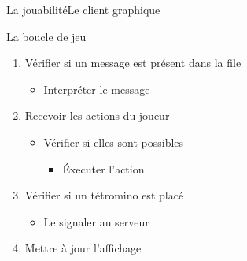 \documentclass[french]{beamer}
\begin{document}
		\begin{frame}{La jouabilité}{Le client graphique}
			\begin{block}{La boucle de jeu}				
				\begin{enumerate}
					\item Vérifier si un message est présent dans la file
						\begin{itemize}
							\item Interpréter le message
						\end{itemize}
					\item Recevoir les actions du joueur
						\begin{itemize}
							\item Vérifier si elles sont possibles
							\begin{itemize}
								\item \'Executer l'action
							\end{itemize}
						\end{itemize}

					\item Vérifier si un tétromino est placé
						\begin{itemize}
							\item Le signaler au serveur
						\end{itemize}

					\item Mettre à jour l'affichage
				\end{enumerate}
			\end{block}
		\end{frame}
\end{document}

